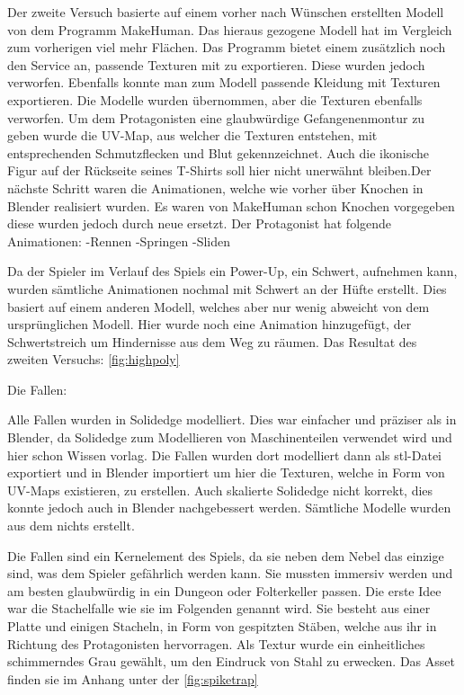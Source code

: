 \documentclass[12pt]{article}
\begin{document}
\noindent Der zweite Versuch basierte auf einem vorher nach Wünschen erstellten Modell von dem Programm MakeHuman. Das hieraus gezogene Modell hat im Vergleich zum vorherigen
viel mehr Flächen. Das Programm bietet einem zusätzlich noch den Service an, passende Texturen mit zu exportieren. Diese wurden jedoch verworfen. Ebenfalls konnte man zum
Modell passende Kleidung mit Texturen exportieren. Die Modelle wurden übernommen, aber die Texturen ebenfalls verworfen. Um dem Protagonisten eine glaubwürdige
Gefangenenmontur zu geben wurde die UV-Map, aus welcher die Texturen entstehen, mit entsprechenden Schmutzflecken und Blut gekennzeichnet. Auch die ikonische Figur
auf der Rückseite seines T-Shirts soll hier nicht unerwähnt bleiben.Der nächste Schritt waren die Animationen, welche wie vorher über Knochen in Blender realisiert wurden.
Es waren von MakeHuman schon Knochen vorgegeben diese wurden jedoch durch neue ersetzt. 
Der Protagonist hat folgende Animationen:\newline
	-Rennen\newline
	-Springen\newline
	-Sliden\newline

\noindent Da der Spieler im Verlauf des Spiels ein Power-Up, ein Schwert, aufnehmen kann, wurden sämtliche Animationen nochmal mit Schwert an der Hüfte erstellt. Dies basiert auf
einem anderen Modell, welches aber nur wenig abweicht von dem ursprünglichen Modell. Hier wurde noch eine Animation hinzugefügt, der Schwertstreich um Hindernisse aus dem
Weg zu räumen. Das Resultat des zweiten Versuchs: \ref{fig:highpoly} \newline

Die Fallen:\newline

Alle Fallen wurden in Solidedge modelliert. Dies war einfacher und präziser als in Blender, da Solidedge zum Modellieren von Maschinenteilen verwendet wird und hier schon Wissen vorlag.
Die Fallen wurden dort modelliert dann als stl-Datei exportiert und in Blender importiert um hier die Texturen, welche in Form von UV-Maps existieren, zu erstellen. Auch skalierte Solidedge
nicht korrekt, dies konnte jedoch auch in Blender nachgebessert werden. Sämtliche Modelle wurden aus dem nichts erstellt.\newline

Die Fallen sind ein Kernelement des Spiels, da sie neben dem Nebel das einzige sind, was dem Spieler gefährlich werden kann. Sie mussten immersiv werden und am besten glaubwürdig
in ein Dungeon oder Folterkeller passen. Die erste Idee war die Stachelfalle wie sie im Folgenden genannt wird. Sie besteht aus einer Platte und einigen Stacheln, in Form von gespitzten
Stäben, welche aus ihr in Richtung des Protagonisten hervorragen. Als Textur wurde ein einheitliches schimmerndes Grau gewählt, um den Eindruck von Stahl zu erwecken. Das Asset finden
sie im Anhang unter der \ref{fig:spiketrap}\newline
\end{document}
